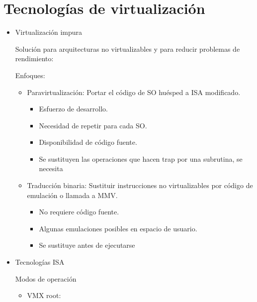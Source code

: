 \documentclass[12pt, twoside, openright]{report} %
\begin{document}
\pagebreak
\section{Tecnologías de virtualización}

\begin{itemize}
	\item Virtualización impura

	      Solución para arquitecturas no virtualizables y para
	      reducir problemas de rendimiento:

	      Enfoques:
	      \begin{itemize}
		      \item Paravirtualización: Portar el código de SO huésped a ISA
		            modificado.
		            \begin{itemize}
			            \item Esfuerzo de desarrollo.
			            \item Necesidad de repetir para cada SO.
			            \item Disponibilidad de código fuente.
			            \item Se sustituyen las operaciones que hacen trap por una subrutina, se necesita
		            \end{itemize}

		      \item Traducción binaria: Sustituir instrucciones no
		            virtualizables por código de emulación o llamada a MMV.
		            \begin{itemize}
			            \item No requiere código fuente.
			            \item Algunas emulaciones posibles en espacio de usuario.
			            \item Se sustituye antes de ejecutarse
		            \end{itemize}

	      \end{itemize}

	\item Tecnologías ISA
	      \begin{figure}[H]
		      {\def\svgwidth{.9\textwidth}
			      }
	      \end{figure}
	      \begin{figure}[H]
		      {\def\svgwidth{.9\textwidth}
			      }
	      \end{figure}
	      Modos de operación
	      \begin{itemize}
		      \item VMX root:


\end{itemize}
\end{itemize}
\end{document}
